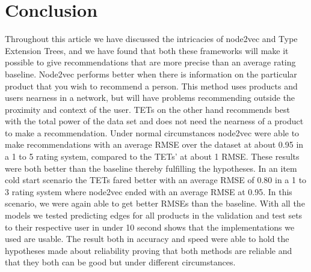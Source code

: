 \section{Conclusion}
Throughout this article we have discussed the intricacies of node2vec and Type Extension Trees, and we have found that both these frameworks will make it possible to give recommendations that are more precise than an average rating baseline.
Node2vec performs better when there is information on the particular product that you wish to recommend a person.
This method uses products and users nearness in a network, but will have problems recommending outside the proximity and context of the user.
TETs on the other hand recommends best with the total power of the data set and does not need the nearness of a product to make a recommendation.
Under normal circumstances node2vec were able to make recommendations with an average RMSE over the dataset at about 0.95 in a 1 to 5 rating system, compared to the TETs' at about 1 RMSE.
These results were both better than the baseline thereby fulfilling the hypotheses.
In an item cold start scenario the TETs fared better with an average RMSE of 0.80 in a 1 to 3 rating system where node2vec ended with an average RMSE at 0.95.
In this scenario, we were again able to get better RMSEs than the baseline.
With all the models we tested predicting edges for all products in the validation and test sets to their respective user in under 10 second shows that the implementations we used are usable.
The result both in accuracy and speed were able to hold the hypotheses made about reliability proving that both methods are reliable and that they both can be good but under different circumstances.
